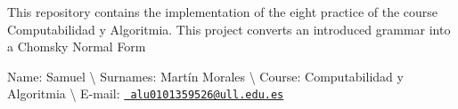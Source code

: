 This repository contains the implementation of the eight practice of the course {\ttfamily Computabilidad y Algoritmia}. This project converts an introduced grammar into a Chomsky Normal Form

Name\+: Samuel \textbackslash{} Surnames\+: Martín Morales \textbackslash{} Course\+: Computabilidad y Algoritmia \textbackslash{} E-\/mail\+: \href{mailto:alu0101359526@ull.edu.es}{\texttt{ alu0101359526@ull.\+edu.\+es}} 